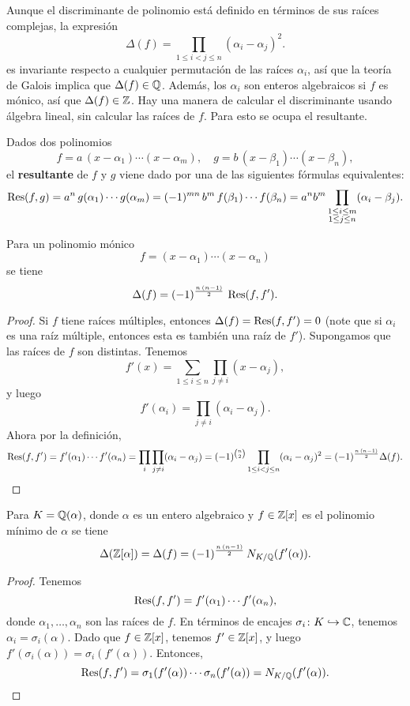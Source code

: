 Aunque el discriminante de polinomio está definido en términos de sus raíces
complejas, la expresión
$$\Delta (f) = \prod_{1 \le i < j \le n} (\alpha_i - \alpha_j)^2.$$
es invariante respecto a cualquier permutación de las raíces $\alpha_i$, así que
la teoría de Galois implica que $\Delta (f) \in \mathbb{Q}$. Además, los $\alpha_i$
son enteros algebraicos si $f$ es mónico, así que $\Delta (f) \in \mathbb{Z}$.
Hay una manera de calcular el discriminante usando álgebra lineal, sin calcular
las raíces de $f$. Para esto se ocupa el resultante.

\begin{definicion}
  Dados dos polinomios
  \[ f = a\,(x - \alpha_1)\cdots (x - \alpha_m), \quad
     g = b\,(x - \beta_1)\cdots (x - \beta_n), \]
  el \textbf{resultante} de $f$ y $g$ viene dado por una de las siguientes
  fórmulas equivalentes:
  \[ \operatorname{Res} (f,g) = a^n\,g (\alpha_1) \cdots g (\alpha_m)
      = (-1)^{mn}\,b^m\,f (\beta_1) \cdots f (\beta_n)
      = a^n b^m \prod_{\substack{1 \le i \le m \\ 1 \le j \le n}} (\alpha_i - \beta_j). \]
\end{definicion}

\begin{proposicion}
  Para un polinomio mónico
  $$f = (x - \alpha_1)\cdots (x - \alpha_n)$$
  se tiene
  $$\Delta (f) = (-1)^{\frac{n\,(n-1)}{2}} \, \operatorname{Res} (f,f').$$

  \begin{proof}
    Si $f$ tiene raíces múltiples, entonces $\Delta (f) = \operatorname{Res} (f,f') = 0$
    (note que si $\alpha_i$ es una raíz múltiple, entonces esta es también una
    raíz de $f'$). Supongamos que las raíces de $f$ son distintas. Tenemos
    $$f' (x) = \sum_{1 \le i \le n} \prod_{j\ne i} (x - \alpha_j),$$
    y luego
    $$f' (\alpha_i) = \prod_{j \ne i} (\alpha_i - \alpha_j).$$
    Ahora por la definición,
    \[ \operatorname{Res} (f,f') = f' (\alpha_1) \cdots f' (\alpha_n) =
       \prod_i \prod_{j \ne i} (\alpha_i - \alpha_j) =
       (-1)^{n \choose 2} \prod_{1 \le i < j \le n} (\alpha_i - \alpha_j)^2 =
       (-1)^{\frac{n\,(n-1)}{2}} \Delta (f). \qedhere \]
  \end{proof}
\end{proposicion}

\begin{corolario}
  Para $K = \mathbb{Q} (\alpha)$, donde $\alpha$ es un entero algebraico y
  $f \in \mathbb{Z} [x]$ es el polinomio mínimo de $\alpha$ se tiene
  \[ \Delta (\mathbb{Z} [\alpha]) = \Delta (f)
     = (-1)^{\frac{n\,(n-1)}{2}}\,N_{K/\mathbb{Q}} (f' (\alpha)). \]

  \begin{proof}
    Tenemos
    $$\operatorname{Res} (f,f') = f' (\alpha_1) \cdots f' (\alpha_n),$$
    donde $\alpha_1,\ldots,\alpha_n$ son las raíces de $f$. En términos de
    encajes $\sigma_i\colon K\hookrightarrow \mathbb{C}$, tenemos
    $\alpha_i = \sigma_i (\alpha)$. Dado que $f \in \mathbb{Z} [x]$, tenemos
    $f' \in \mathbb{Z} [x]$, y luego $f' (\sigma_i (\alpha)) = \sigma_i (f' (\alpha))$.
    Entonces,
    \[ \operatorname{Res} (f,f') = \sigma_1 (f' (\alpha)) \cdots \sigma_n (f' (\alpha)) =
       N_{K/\mathbb{Q}} (f' (\alpha)). \qedhere \]
  \end{proof}
\end{corolario}

